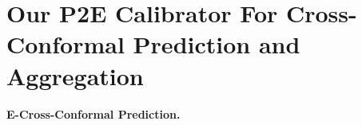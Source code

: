 \documentclass{article}
\theoremstyle{plain}
\theoremstyle{definition}
\theoremstyle{remark}
\begin{document}
\section{Our P2E Calibrator For Cross-Conformal Prediction and Aggregation}




\paragraph{E-Cross-Conformal Prediction.}



\end{document}
